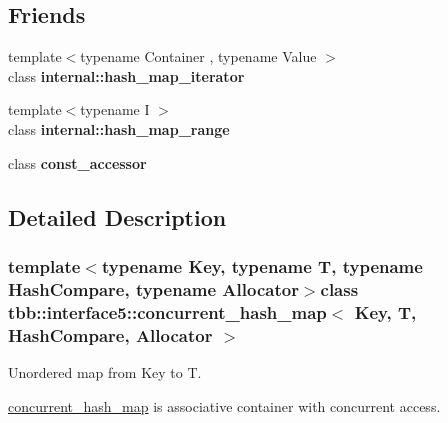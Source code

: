 \subsection*{Friends}
\begin{DoxyCompactItemize}
\item 
\hypertarget{classtbb_1_1interface5_1_1concurrent__hash__map_a0ecadabdc31088d7bace5a0b6e5ee3f9}{}{\footnotesize template$<$typename Container , typename Value $>$ }\\class {\bfseries internal\+::hash\+\_\+map\+\_\+iterator}\label{classtbb_1_1interface5_1_1concurrent__hash__map_a0ecadabdc31088d7bace5a0b6e5ee3f9}

\item 
\hypertarget{classtbb_1_1interface5_1_1concurrent__hash__map_ad49112156111ee1b85be9f4b89e410ca}{}{\footnotesize template$<$typename I $>$ }\\class {\bfseries internal\+::hash\+\_\+map\+\_\+range}\label{classtbb_1_1interface5_1_1concurrent__hash__map_ad49112156111ee1b85be9f4b89e410ca}

\item 
\hypertarget{classtbb_1_1interface5_1_1concurrent__hash__map_a584bf754a8408612d4bfd33a3eafd80d}{}class {\bfseries const\+\_\+accessor}\label{classtbb_1_1interface5_1_1concurrent__hash__map_a584bf754a8408612d4bfd33a3eafd80d}

\end{DoxyCompactItemize}


\subsection{Detailed Description}
\subsubsection*{template$<$typename Key, typename T, typename Hash\+Compare, typename Allocator$>$class tbb\+::interface5\+::concurrent\+\_\+hash\+\_\+map$<$ Key, T, Hash\+Compare, Allocator $>$}

Unordered map from Key to T. 

\hyperlink{classtbb_1_1interface5_1_1concurrent__hash__map}{concurrent\+\_\+hash\+\_\+map} is associative container with concurrent access.


